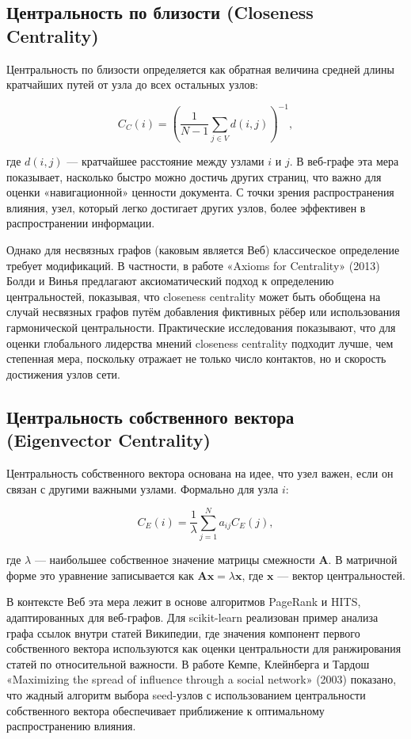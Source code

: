 \documentclass[12pt, a4paper]{article}
\begin{document}
\subsection{Центральность по близости (Closeness Centrality)}

Центральность по близости определяется как обратная величина средней длины кратчайших путей от узла до всех остальных узлов:

\[
C_C(i) = \left( \frac{1}{N-1} \sum_{j \in V} d(i,j) \right)^{-1},
\]

где $d(i,j)$ — кратчайшее расстояние между узлами $i$ и $j$. В веб-графе эта мера показывает, насколько быстро можно достичь других страниц, что важно для оценки «навигационной» ценности документа. С точки зрения распространения влияния, узел, который легко достигает других узлов, более эффективен в распространении информации.

Однако для несвязных графов (каковым является Веб) классическое определение требует модификаций. В частности, в работе «Axioms for Centrality» (2013) Болди и Винья предлагают аксиоматический подход к определению центральностей, показывая, что closeness centrality может быть обобщена на случай несвязных графов путём добавления фиктивных рёбер или использования гармонической центральности. Практические исследования показывают, что для оценки глобального лидерства мнений closeness centrality подходит лучше, чем степенная мера, поскольку отражает не только число контактов, но и скорость достижения узлов сети.

\subsection{Центральность собственного вектора (Eigenvector Centrality)}

Центральность собственного вектора основана на идее, что узел важен, если он связан с другими важными узлами. Формально для узла $i$:

\[
C_E(i) = \frac{1}{\lambda} \sum_{j=1}^{N} a_{ij} C_E(j),
\]

где $\lambda$ — наибольшее собственное значение матрицы смежности $\mathbf{A}$. В матричной форме это уравнение записывается как $\mathbf{A}\mathbf{x} = \lambda \mathbf{x}$, где $\mathbf{x}$ — вектор центральностей.

В контексте Веб эта мера лежит в основе алгоритмов PageRank и HITS, адаптированных для веб-графов. Для scikit-learn реализован пример анализа графа ссылок внутри статей Википедии, где значения компонент первого собственного вектора используются как оценки центральности для ранжирования статей по относительной важности. В работе Кемпе, Клейнберга и Тардош «Maximizing the spread of influence through a social network» (2003) показано, что жадный алгоритм выбора seed-узлов с использованием центральности собственного вектора обеспечивает приближение к оптимальному распространению влияния.
\end{document}
